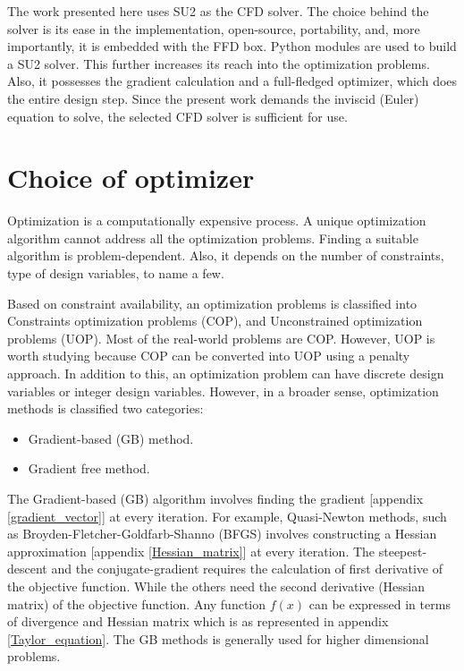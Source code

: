 The work presented here uses SU2 as the CFD solver. The choice behind the solver is its ease in the implementation, open-source, portability, and, more importantly, it is embedded with the FFD box. Python modules are used to build a SU2 solver. This further increases its reach into the optimization problems. Also, it possesses the gradient calculation and a full-fledged optimizer, which does the entire design step. Since the present work demands the inviscid (Euler) equation to solve, the selected CFD solver is sufficient for use.

\section{Choice of optimizer}
Optimization is a computationally expensive process. A unique optimization algorithm cannot address all the optimization problems. Finding a suitable algorithm is problem-dependent. Also, it depends on the number of constraints, type of design variables, to name a few.

Based on constraint availability, an optimization problems is classified into Constraints optimization problems (COP), and Unconstrained optimization problems (UOP). Most of the real-world problems are COP. However, UOP is worth studying because COP can be converted into UOP using a penalty approach. In addition to this, an optimization problem can have discrete design variables or integer design variables.
However, in a broader sense, optimization methods is classified two categories:
\begin{itemize}
\item Gradient-based (GB) method.
\item Gradient free method.
\end{itemize}

The Gradient-based (GB) algorithm involves finding the gradient [appendix \ref{gradient_vector}] at every iteration. For example, Quasi-Newton methods, such as Broyden-Fletcher-Goldfarb-Shanno (BFGS) involves constructing a Hessian approximation [appendix \ref{Hessian_matrix}] at every iteration. The steepest-descent and the conjugate-gradient requires the calculation of first derivative of the objective function. While the others need the second derivative (Hessian matrix) of the objective function. Any function $f(x)$ can be expressed in terms of divergence and Hessian matrix which is as represented in appendix \ref{Taylor_equation}. The GB methods is generally used for higher dimensional problems.

